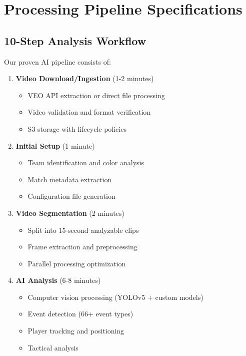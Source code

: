 \documentclass[11pt,a4paper]{article}
\begin{document}
\section{Processing Pipeline Specifications}

\subsection{10-Step Analysis Workflow}
Our proven AI pipeline consists of:

\begin{enumerate}[leftmargin=1.5cm]
    \item \textbf{Video Download/Ingestion} (1-2 minutes)
    \begin{itemize}
        \item VEO API extraction or direct file processing
        \item Video validation and format verification
        \item S3 storage with lifecycle policies
    \end{itemize}
    
    \item \textbf{Initial Setup} (1 minute)
    \begin{itemize}
        \item Team identification and color analysis
        \item Match metadata extraction
        \item Configuration file generation
    \end{itemize}
    
    \item \textbf{Video Segmentation} (2 minutes)
    \begin{itemize}
        \item Split into 15-second analyzable clips
        \item Frame extraction and preprocessing
        \item Parallel processing optimization
    \end{itemize}
    
    \item \textbf{AI Analysis} (6-8 minutes)
    \begin{itemize}
        \item Computer vision processing (YOLOv5 + custom models)
        \item Event detection (66+ event types)
        \item Player tracking and positioning
        \item Tactical analysis
    \end{itemize}
    

\end{enumerate}
\end{document}
